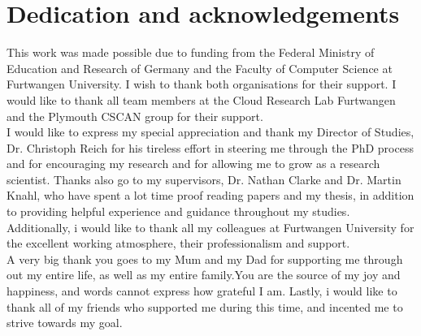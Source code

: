 %
%

\chapter*{Dedication and acknowledgements}
\begin{SingleSpace}
This work was made possible due to funding from the Federal Ministry of Education and Research of Germany and the Faculty of Computer Science at Furtwangen University. I wish to thank both organisations for their support. I would like to thank all team members at the Cloud Research Lab Furtwangen and the Plymouth CSCAN group for their support.\\

I would like to express my special appreciation and thank my Director of Studies, Dr. Christoph Reich for his tireless effort in steering me through the PhD process and for encouraging my research and for allowing me to grow as a research scientist.  Thanks also go to my supervisors, Dr. Nathan Clarke and Dr. Martin Knahl, who have spent a lot time proof reading papers and my thesis, in addition to providing helpful experience and guidance throughout my studies.  Additionally, i would like to thank all my colleagues at Furtwangen University for the excellent working atmosphere, their professionalism and support. \\

A very big thank you goes to my Mum and my Dad  for supporting me through out my entire life, as well as my entire family.You are the source of my joy and happiness, and words cannot express how grateful I am. Lastly, i would  like to thank all of my friends who supported me during this time, and incented me to strive towards my goal. 
\end{SingleSpace}
\clearpage

